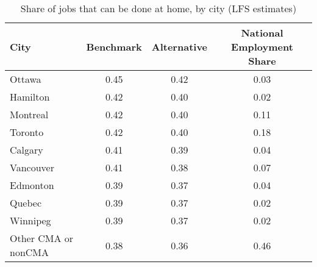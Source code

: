 \begin{table}[ht]
\centering
\caption{Share of jobs that can be done at home, by city (LFS estimates)} 
\label{tab:cities_lfs}
\begin{tabular}{lccc}
  \hline
City & Benchmark & Alternative & National Employment Share \\ 
  \hline
Ottawa & 0.45 & 0.42 & 0.03 \\ 
  Hamilton & 0.42 & 0.40 & 0.02 \\ 
  Montreal & 0.42 & 0.40 & 0.11 \\ 
  Toronto & 0.42 & 0.40 & 0.18 \\ 
  Calgary & 0.41 & 0.39 & 0.04 \\ 
  Vancouver & 0.41 & 0.38 & 0.07 \\ 
  Edmonton & 0.39 & 0.37 & 0.04 \\ 
  Quebec & 0.39 & 0.37 & 0.02 \\ 
  Winnipeg & 0.39 & 0.37 & 0.02 \\ 
  Other CMA or nonCMA  & 0.38 & 0.36 & 0.46 \\ 
   \hline
\end{tabular}
\end{table}
